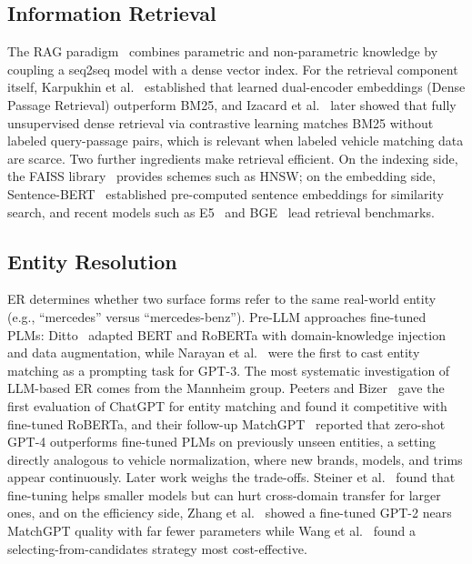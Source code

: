 \documentclass[conference]{IEEEtran}
\begin{document}
\subsection{Information Retrieval}

The RAG paradigm~\cite{lewis2020rag} combines parametric and non-parametric knowledge by coupling a seq2seq model with a dense vector index. For the retrieval component itself, Karpukhin et al.~\cite{karpukhin2020dpr} established that learned dual-encoder embeddings (Dense Passage Retrieval) outperform BM25, and Izacard et al.~\cite{izacard2022contriever} later showed that fully unsupervised dense retrieval via contrastive learning matches BM25 without labeled query-passage pairs, which is relevant when labeled vehicle matching data are scarce. Two further ingredients make retrieval efficient. On the indexing side, the FAISS library~\cite{johnson2021faiss, douze2024faiss} provides schemes such as HNSW; on the embedding side, Sentence-BERT~\cite{reimers2019sbert} established pre-computed sentence embeddings for similarity search, and recent models such as E5~\cite{wang2022e5} and BGE~\cite{xiao2024bge} lead retrieval benchmarks.

\subsection{Entity Resolution}

ER determines whether two surface forms refer to the same real-world entity (e.g., ``mercedes'' versus ``mercedes-benz''). Pre-LLM approaches fine-tuned PLMs: Ditto~\cite{li2020ditto} adapted BERT and RoBERTa with domain-knowledge injection and data augmentation, while Narayan et al.~\cite{narayan2022foundation} were the first to cast entity matching as a prompting task for GPT-3. The most systematic investigation of LLM-based ER comes from the Mannheim group. Peeters and Bizer~\cite{peeters2023chatgpt_em} gave the first evaluation of ChatGPT for entity matching and found it competitive with fine-tuned RoBERTa, and their follow-up MatchGPT~\cite{peeters2025matchgpt} reported that zero-shot GPT-4 outperforms fine-tuned PLMs on previously unseen entities, a setting directly analogous to vehicle normalization, where new brands, models, and trims appear continuously. Later work weighs the trade-offs. Steiner et al.~\cite{steiner2024finetune_em} found that fine-tuning helps smaller models but can hurt cross-domain transfer for larger ones, and on the efficiency side, Zhang et al.~\cite{zhang2024anymatch} showed a fine-tuned GPT-2 nears MatchGPT quality with far fewer parameters while Wang et al.~\cite{wang2025comem} found a selecting-from-candidates strategy most cost-effective.
\end{document}
